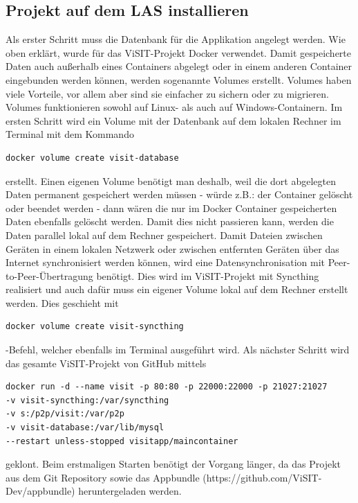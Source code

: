 \subsection{Projekt auf dem LAS installieren}

Als erster Schritt muss die Datenbank für die Applikation angelegt werden. Wie oben erklärt, wurde für das ViSIT-Projekt Docker verwendet. Damit gespeicherte Daten auch außerhalb eines Containers abgelegt oder in einem anderen Container eingebunden werden können, werden sogenannte Volumes erstellt. Volumes haben viele Vorteile, vor allem aber sind sie einfacher zu sichern oder zu migrieren. Volumes funktionieren sowohl auf Linux- als auch auf Windows-Containern.
Im ersten Schritt wird ein Volume mit der Datenbank auf dem lokalen Rechner im Terminal mit dem Kommando
\begin{lstlisting}[style=MyBashStyle]
docker volume create visit-database
\end{lstlisting} erstellt. Einen eigenen Volume benötigt man deshalb, weil die dort abgelegten Daten permanent gespeichert werden müssen - würde z.B.: der Container gelöscht oder beendet werden - dann wären die nur im Docker Container gespeicherten Daten ebenfalls gelöscht werden. Damit dies nicht passieren kann, werden die Daten parallel lokal auf dem Rechner gespeichert.
Damit Dateien zwischen Geräten in einem lokalen Netzwerk oder zwischen entfernten Geräten über das Internet synchronisiert werden können, wird eine Datensynchronisation mit Peer-to-Peer-Übertragung benötigt. Dies wird im ViSIT-Projekt mit Syncthing realisiert und auch dafür muss ein eigener Volume lokal auf dem Rechner erstellt werden. Dies geschieht mit \begin{lstlisting}[style=MyBashStyle]
docker volume create visit-syncthing
\end{lstlisting}-Befehl, welcher ebenfalls im Terminal ausgeführt wird.
Als nächster Schritt wird das gesamte ViSIT-Projekt von GitHub mittels

\begin{lstlisting}[style=MyBashStyle]
docker run -d --name visit -p 80:80 -p 22000:22000 -p 21027:21027
-v visit-syncthing:/var/syncthing
-v s:/p2p/visit:/var/p2p
-v visit-database:/var/lib/mysql
--restart unless-stopped visitapp/maincontainer \end{lstlisting}

geklont. Beim erstmaligen Starten benötigt der Vorgang länger, da das Projekt aus dem Git Repository sowie das Appbundle (https://github.com/ViSIT-Dev/appbundle) heruntergeladen werden.\\

